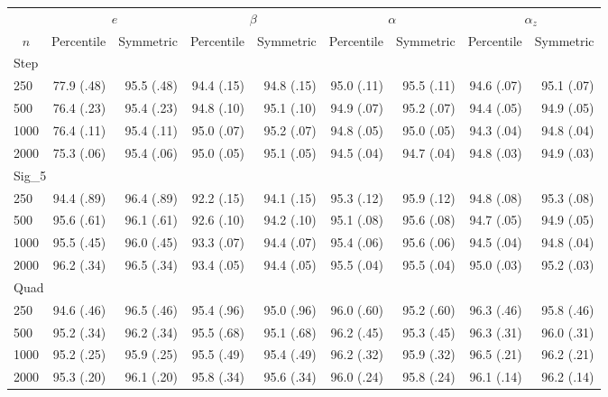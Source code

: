 \documentclass{article}
\begin{document}
\begin{tabular}{lrrrrrrrr}
   \hline
 
       &  \multicolumn{2}{c}{$e$}    & \multicolumn{2}{c}{$\beta$}  & \multicolumn{2}{c}{$\alpha$}  & \multicolumn{2}{c}{$\alpha_z$} \\ 
         \multicolumn{1}{c}{$n$} & \multicolumn{1}{c}{Percentile}& \multicolumn{1}{c}{Symmetric}& \multicolumn{1}{c}{Percentile}& \multicolumn{1}{c}{Symmetric}& \multicolumn{1}{c}{Percentile}& \multicolumn{1}{c}{Symmetric}& \multicolumn{1}{c}{Percentile}& \multicolumn{1}{c}{Symmetric} \\ 
         \hline   
 \multicolumn{9}{l}{Step} \\ 
250 & 77.9 (.48) & 95.5 (.48) & 94.4 (.15) & 94.8 (.15) & 95.0 (.11) & 95.5 (.11) & 94.6 (.07) & 95.1 (.07) \\ 
  500 & 76.4 (.23) & 95.4 (.23) & 94.8 (.10) & 95.1 (.10) & 94.9 (.07) & 95.2 (.07) & 94.4 (.05) & 94.9 (.05) \\ 
  1000 & 76.4 (.11) & 95.4 (.11) & 95.0 (.07) & 95.2 (.07) & 94.8 (.05) & 95.0 (.05) & 94.3 (.04) & 94.8 (.04) \\ 
  2000 & 75.3 (.06) & 95.4 (.06) & 95.0 (.05) & 95.1 (.05) & 94.5 (.04) & 94.7 (.04) & 94.8 (.03) & 94.9 (.03) \\ 
       \hline   
 \multicolumn{9}{l}{Sig\_5} \\ 
250 & 94.4 (.89) & 96.4 (.89) & 92.2 (.15) & 94.1 (.15) & 95.3 (.12) & 95.9 (.12) & 94.8 (.08) & 95.3 (.08) \\ 
  500 & 95.6 (.61) & 96.1 (.61) & 92.6 (.10) & 94.2 (.10) & 95.1 (.08) & 95.6 (.08) & 94.7 (.05) & 94.9 (.05) \\ 
  1000 & 95.5 (.45) & 96.0 (.45) & 93.3 (.07) & 94.4 (.07) & 95.4 (.06) & 95.6 (.06) & 94.5 (.04) & 94.8 (.04) \\ 
  2000 & 96.2 (.34) & 96.5 (.34) & 93.4 (.05) & 94.4 (.05) & 95.5 (.04) & 95.5 (.04) & 95.0 (.03) & 95.2 (.03) \\ 
       \hline   
 \multicolumn{9}{l}{Quad} \\ 
250 & 94.6 (.46) & 96.5 (.46) & 95.4 (.96) & 95.0 (.96) & 96.0 (.60) & 95.2 (.60) & 96.3 (.46) & 95.8 (.46) \\ 
  500 & 95.2 (.34) & 96.2 (.34) & 95.5 (.68) & 95.1 (.68) & 96.2 (.45) & 95.3 (.45) & 96.3 (.31) & 96.0 (.31) \\ 
  1000 & 95.2 (.25) & 95.9 (.25) & 95.5 (.49) & 95.4 (.49) & 96.2 (.32) & 95.9 (.32) & 96.5 (.21) & 96.2 (.21) \\ 
  2000 & 95.3 (.20) & 96.1 (.20) & 95.8 (.34) & 95.6 (.34) & 96.0 (.24) & 95.8 (.24) & 96.1 (.14) & 96.2 (.14) \\ 
   \hline
\end{tabular}
\end{document}
